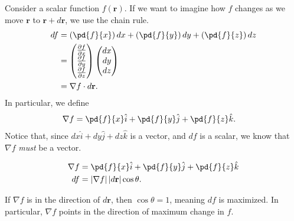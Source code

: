 \documentclass[10pt]{mypackage}
\begin{document}
Consider a scalar function $f\left(\mathbf{r}\right)$. If we want to imagine how $f$ changes as we move $\mathbf{r}$ to $\mathbf{r} + d\mathbf{r}$, we use the chain rule.
\begin{align*}
  df &= \left(\pd{f}{x}\right)dx + \left(\pd{f}{y}\right)dy + \left(\pd{f}{z}\right)dz\\
     &= \begin{pmatrix}\frac{\partial f}{\partial x}\\\frac{\partial f}{\partial y}\\\frac{\partial f}{\partial z}\end{pmatrix} \begin{pmatrix}dx\\dy\\dz\end{pmatrix}\\
     &= \nabla f \cdot d\mathbf{r}.
\end{align*}
In particular, we define
\begin{align*}
  \nabla f &= \pd{f}{x} \hat{i} + \pd{f}{y}\hat{j} + \pd{f}{z}\hat{k}.
\end{align*}
Notice that, since $dx\hat{i} + dy\hat{j} + dz\hat{k}$ is a vector, and $df$ is a scalar, we know that $\nabla f$ \textit{must} be a vector.
\begin{definition}[Gradient]
  \begin{align*}
    \nabla f &= \pd{f}{x} \hat{i} + \pd{f}{y}\hat{j} + \pd{f}{z}\hat{k}\\
    df &= \left\vert \nabla f \right\vert \left\vert d\mathbf{r} \right\vert \cos\theta.
  \end{align*}
\end{definition}
If $\nabla f$ is in the direction of $d\mathbf{r}$, then $\cos\theta = 1$, meaning $df$ is maximized. In particular, $\nabla f$ points in the direction of maximum change in $f$.\newline
\end{document}
